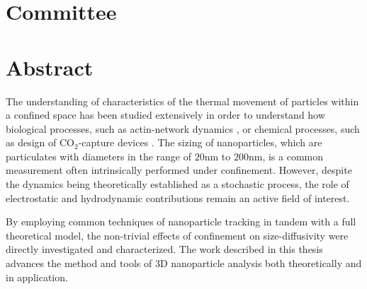 
\section*{Committee}

\noindent

\setstacktabulargap{30pt}
\centerline{}





\newpage
\section*{Abstract}
The understanding of characteristics of the thermal movement of particles within a confined space has been studied extensively in order to understand how biological processes, such as actin-network dynamics \cite{fujiwara_confined_2016}, or chemical processes, such as design of $\mathrm{CO}_2$-capture devices \cite{gu_design_2026}. The sizing of nanoparticles, which are particulates with diameters in the range of $20\mathrm{ nm}$ to $200\mathrm{ nm}$, is a common measurement often intrinsically performed under confinement. However, despite the dynamics being theoretically established as a stochastic process, the role of electrostatic and hydrodynamic contributions remain an active field of interest.

 By employing common techniques of nanoparticle tracking in tandem with a full theoretical model, the non-trivial effects of confinement on size-diffusivity were directly investigated and characterized. The work described in this thesis advances the method and tools of 3D nanoparticle analysis both theoretically and in application.

